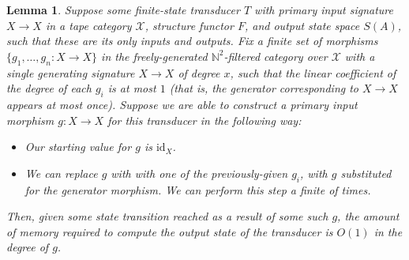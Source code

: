 \documentclass[10pt,a4paper]{amsart}
\newtheorem{lemma}{Lemma}
\begin{document}
\begin{lemma}
    \label{lem:fsmprepending} Suppose some finite-state transducer
    $T$ with
    primary input signature
    $X\to X$ in a tape category $\mathcal{X}$, structure
    functor $F$, and output state space
    $S(A)$, such that these are its only inputs and outputs.
    Fix a finite set of morphisms $\{g_1,\dots,g_n:X\to X\}$ in
    the freely-generated $\mathbb{N}^2$-filtered category over
    $\mathcal{X}$ with a single generating signature
    $X\to X$ of degree $x$, such that the linear coefficient of
    the degree of each $g_i$ is at most $1$ (that is, the generator
    corresponding to $X\to X$ appears at most once).
    Suppose
    we are able to construct a
    primary input morphism $g:X\to X$
    for this transducer in the following
    way:
    \begin{itemize}
        \item Our starting value for $g$ is $\mathrm{id}_X$.
        \item We can replace $g$ with
        with one of the previously-given $g_i$,
        with $g$ substituted for the
        generator morphism. We can perform this step a finite
        of times.
    \end{itemize}
    Then, given some state transition reached as a result of some
    such $g$,
    the amount of memory required to compute the output state of
    the transducer is $O(1)$ in the degree of $g$.
\end{lemma}
\end{document}
